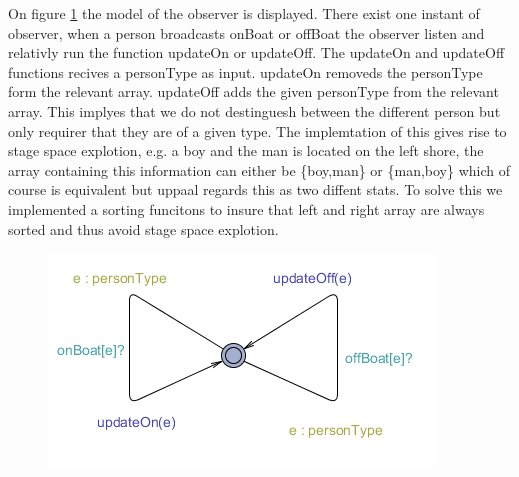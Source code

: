On figure \ref{fig:observer} the model of the observer is displayed. There exist one instant of observer, when a person broadcasts onBoat or offBoat the observer listen and relativly run the function updateOn or updateOff. 
The updateOn and updateOff functions recives a personType as input. updateOn removeds the personType form the relevant array. updateOff adds the given personType from the relevant array. This implyes that we do not destinguesh between the different person but only requirer that they are of a given type. The implemtation of this gives rise to stage space explotion, e.g. a boy and the man is located on the left shore, the array containing this information can either be \{boy,man\} or \{man,boy\} which of course is equivalent but uppaal regards this as two diffent stats. To solve this we implemented a sorting funcitons to insure that left and right array are always sorted and thus avoid stage space explotion.

\begin{figure}%
\includegraphics[width=\columnwidth]{pictures/observer.png}%
\caption{}%
\label{fig:observer}%
\end{figure}


